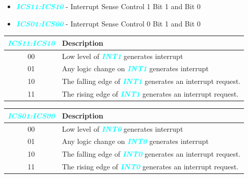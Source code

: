 \documentclass{article}
\newcommand{\bitFormat}[1]{\emph{\textbf{\textcolor{cyan}{#1}}}}
\begin{document}
\begin{itemize}
    \item \bitFormat{ICS11:ICS10} - Interrupt Sense Control 1 Bit 1 and Bit 0
    \item \bitFormat{ICS01:ICS00} - Interrupt Sense Control 0 Bit 1 and Bit 0
\end{itemize}
\begin{table}[H]
    \begin{minipage}{0.45\textwidth}
        \begin{center}
            \begin{tabular}{c|p{5cm}}
                \bitFormat{ICS11:ICS10} & \textbf{Description}\\
                \hline
                00 & Low level of \bitFormat{INT1} generates interrupt\\
                01 & Any logic change on \bitFormat{INT1} generates interrupt\\
                10 & The falling edge of \bitFormat{INT1} generates an interrupt request.\\
                11 & The rising edge of \bitFormat{INT1} generates an interrupt request.\\
            \end{tabular}
        \end{center}
    \end{minipage}
    \begin{minipage}{0.45\textwidth}
        \begin{center}
            \begin{tabular}{c|p{5cm}}
                \bitFormat{ICS01:ICS00} & \textbf{Description}\\
                \hline
                00 & Low level of \bitFormat{INT0} generates interrupt\\
                01 & Any logic change on \bitFormat{INT0} generates interrupt\\
                10 & The falling edge of \bitFormat{INT0} generates an interrupt request.\\
                11 & The rising edge of \bitFormat{INT0} generates an interrupt request.\\
            \end{tabular}
        \end{center}
    \end{minipage}  
\end{table}
\end{document}
